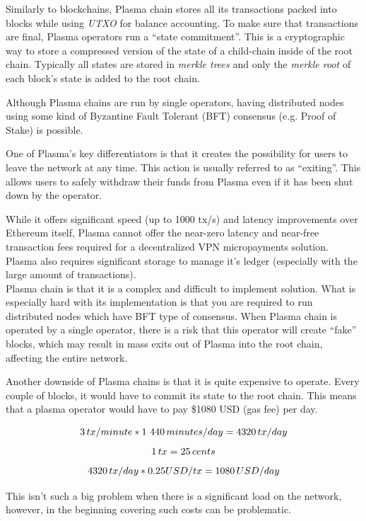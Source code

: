 \documentclass[a4paper,12pt]{article}
\begin{document}
Similarly to blockchains, Plasma chain stores all its transactions packed into 
blocks while using \textit{UTXO} for balance accounting. To make sure that 
transactions are final, Plasma operators run a “state commitment”. This is a 
cryptographic way to store a compressed version of the state of a child-chain 
inside of the root chain. Typically all states are stored in \textit{merkle trees}
and only the \textit{merkle root} of each block’s state is added to the root 
chain.

Although Plasma chains are run by single operators, having distributed nodes 
using some kind of Byzantine Fault Tolerant (BFT) consensus (e.g. Proof of Stake) 
is possible.

One of Plasma’s key differentiators is that it creates the possibility for users 
to leave the network at any time. This action is usually referred to as “exiting”. 
This allows users to safely withdraw their funds from Plasma even if it has been 
shut down by the operator.

While it offers significant speed (up to 1000 tx/s) and latency improvements over 
Ethereum itself, Plasma cannot offer the near-zero latency and near-free transaction 
fees required for a decentralized VPN micropayments solution. Plasma also requires 
significant storage to manage it’s ledger (especially with the large amount of 
transactions). \\

Plasma chain is that it is a complex and difficult to implement solution. What is 
especially hard with its implementation is that you are required to run distributed 
nodes which have BFT type of consensus. When Plasma chain is operated by a single 
operator, there is a risk that this operator will create “fake” blocks, which may 
result in mass exits out of Plasma into the root chain, affecting the entire 
network.

Another downside of Plasma chains is that it is quite expensive to operate. Every 
couple of blocks, it would have to commit its state to the root chain. This means 
that a plasma operator would have to pay \$1080 USD (gas fee) per day.

\[ 3 \thinspace tx / minute * 1 440 \thinspace minutes / day = 4320 \thinspace tx/day \]
\[ 1 \thinspace tx = 25 \thinspace cents \]
\[ 4320 \thinspace tx/day * 0.25 USD/tx = 1080 \thinspace USD/day \]

This isn’t such a big problem when there is a significant load on the network, 
however, in the beginning covering such costs can be problematic.
\end{document}
